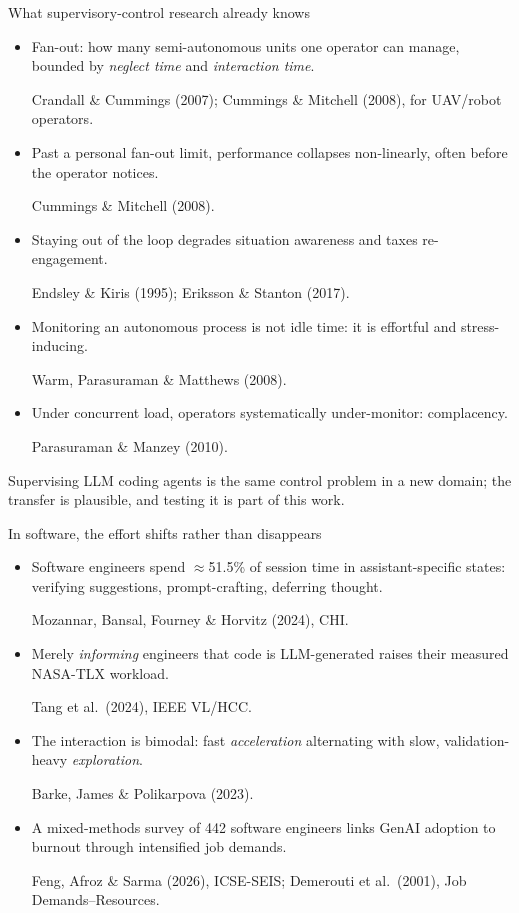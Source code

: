 \documentclass[aspectratio=169,10pt]{beamer}
\newcommand{\good}[1]{\textcolor{Sage}{#1}}
\newcommand{\warnc}[1]{\textcolor{Amber}{#1}}
\newcommand{\src}[1]{{\scriptsize\color{InkFaint}#1\par}}
\begin{document}
\begin{frame}{What supervisory-control research already knows}
  \begin{itemize}
    \item \good{Fan-out}: how many semi-autonomous units one operator can
          manage, bounded by \emph{neglect time} and \emph{interaction time}.
          \src{Crandall \& Cummings (2007); Cummings \& Mitchell (2008), for UAV/robot operators.}
    \item Past a personal fan-out limit, performance collapses
          \alert{non-linearly}, often \alert{before the operator notices}.
          \src{Cummings \& Mitchell (2008).}
    \item Staying out of the loop degrades situation awareness and taxes
          re-engagement. \src{Endsley \& Kiris (1995); Eriksson \& Stanton (2017).}
    \item Monitoring an autonomous process is not idle time: it is
          \warnc{effortful and stress-inducing}. \src{Warm, Parasuraman \& Matthews (2008).}
    \item Under concurrent load, operators systematically under-monitor:
          \warnc{complacency}. \src{Parasuraman \& Manzey (2010).}
  \end{itemize}
  \vspace{1mm}
  {\small Supervising LLM coding agents is the \good{same control problem}
   in a new domain; the transfer is plausible, and testing it is part of
   this work.\par}
\end{frame}

\begin{frame}{In software, the effort shifts rather than disappears}
  \begin{itemize}
    \item Software engineers spend \good{$\approx$51.5\% of session time} in
          assistant-specific states: verifying suggestions, prompt-crafting,
          deferring thought.
          \src{Mozannar, Bansal, Fourney \& Horvitz (2024), CHI.}
    \item Merely \emph{informing} engineers that code is LLM-generated
          raises their measured NASA-TLX workload.
          \src{Tang et al.\ (2024), IEEE VL/HCC.}
    \item The interaction is bimodal: fast \emph{acceleration} alternating
          with slow, validation-heavy \emph{exploration}.
          \src{Barke, James \& Polikarpova (2023).}
    \item A mixed-methods survey of 442 software engineers links GenAI
          adoption to \warnc{burnout through intensified job demands}.
          \src{Feng, Afroz \& Sarma (2026), ICSE-SEIS; Demerouti et al.\ (2001), Job Demands--Resources.}
  \end{itemize}
\end{frame}
\end{document}
